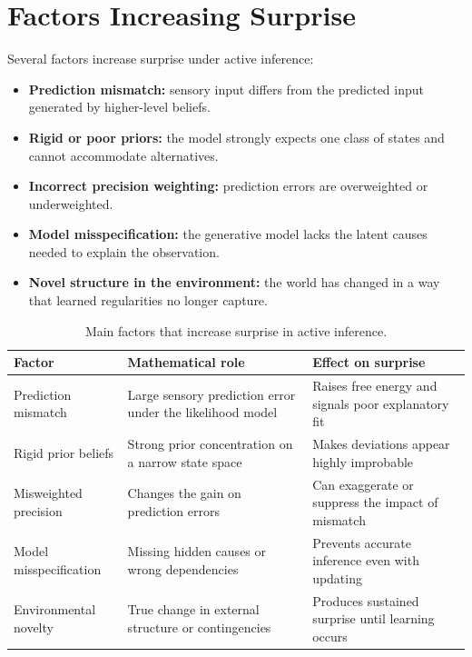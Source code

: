 \documentclass[a4paper,11pt]{article}
\begin{document}
    
    \section{Factors Increasing Surprise}
        Several factors increase surprise under active inference:
        \begin{itemize}[leftmargin=1.8em]
	\item \textbf{Prediction mismatch:} sensory input differs from the predicted input generated by higher-level beliefs.
    \item \textbf{Rigid or poor priors:} the model strongly expects one class of states and cannot accommodate alternatives.
    \item \textbf{Incorrect precision weighting:} prediction errors are overweighted or underweighted.
    \item \textbf{Model misspecification:} the generative model lacks the latent causes needed to explain the observation.
    \item \textbf{Novel structure in the environment:} the world has changed in a way that learned regularities no longer capture.
        \end{itemize}
        
        \begin{table}[H]
            \centering
            \small
            \begin{tabularx}{\textwidth}{>{\raggedright\arraybackslash}p{3.2cm} >{\raggedright\arraybackslash}X >{\raggedright\arraybackslash}X}
		\toprule
        \rowcolor{gray!15}
        \textbf{Factor} & \textbf{Mathematical role} & \textbf{Effect on surprise} \\
        \midrule
        Prediction mismatch & Large sensory prediction error under the likelihood model & Raises free energy and signals poor explanatory fit \\
        Rigid prior beliefs & Strong prior concentration on a narrow state space & Makes deviations appear highly improbable \\
        Misweighted precision & Changes the gain on prediction errors & Can exaggerate or suppress the impact of mismatch \\
        Model misspecification & Missing hidden causes or wrong dependencies & Prevents accurate inference even with updating \\
        Environmental novelty & True change in external structure or contingencies & Produces sustained surprise until learning occurs \\
        \bottomrule
            \end{tabularx}
            \caption{Main factors that increase surprise in active inference.}
        \end{table}
    
\end{document}
